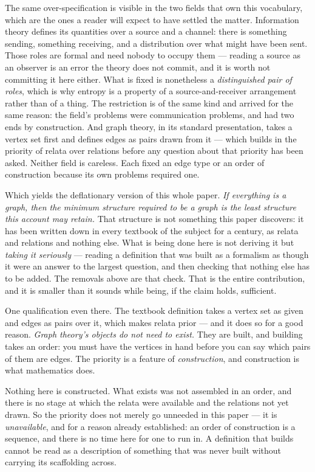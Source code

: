 \documentclass[11pt,a4paper]{article}
\begin{document}
The same over-specification is visible in the two fields that own this vocabulary, which are the ones a
reader will expect to have settled the matter. Information theory defines
its quantities over a source and a channel: there is something sending, something receiving, and a
distribution over what might have been sent. Those roles are formal and need nobody to occupy them --- reading a source as an
observer is an error the theory does not commit, and it is worth not committing it here either. What is
fixed is nonetheless a \emph{distinguished pair of roles}, which is why entropy is a property of a
source-and-receiver arrangement rather than of a thing. The restriction is of the same kind and arrived
for the same reason: the field's problems were communication problems, and had two ends by
construction. And
graph theory, in its standard presentation, takes a vertex set first and defines edges as pairs drawn
from it --- which builds in the priority of relata over relations before any question about that
priority has been asked. Neither field is careless. Each fixed an edge type or an order of construction
because its own problems required one.

Which yields the deflationary version of this whole paper. \emph{If everything is a graph, then the
minimum structure required to be a graph is the least structure this account may retain.} That structure
is not something this paper discovers: it has been written down in every textbook of the subject for a
century, as relata and relations and nothing else. What is being done here is not deriving it but
\emph{taking it seriously} --- reading a definition that was built as a formalism as though it were an
answer to the largest question, and then checking that nothing else has to be added. The removals above
are that check. That is the entire contribution, and it is smaller than it sounds while being, if the
claim holds, sufficient.

One qualification even there. The textbook definition takes
a vertex set as given and edges as pairs over it, which makes relata prior --- and it does so for a good
reason. \emph{Graph theory's objects do not need to exist.} They are built, and building takes an order:
you must have the vertices in hand before you can say which pairs of them are edges. The priority is a
feature of \emph{construction}, and construction is what mathematics does.

Nothing here is constructed. What exists was not assembled in an order, and there is no stage at which
the relata were available and the relations not yet drawn. So the priority does not merely go unneeded
in this paper --- it is \emph{unavailable}, and for a reason already established: an order of
construction is a sequence, and there is no time here for one to run in. A definition that builds cannot
be read as a description of something that was never built without carrying its scaffolding across.
\end{document}
